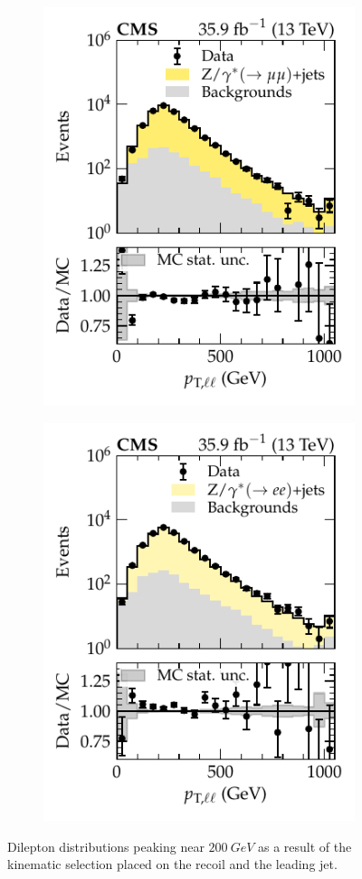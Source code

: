 \begin{figure}[htb]
    \centering
    \begin{subfigure}[b]{0.49\textwidth}
        \centering
        \includegraphics{chapters/041_corrections/images/ptmiss_calib/metres_ptll_mm_incdist.pdf}
        \caption{\dimuplusjets}
        \label{subfiga:metres-zpt}
    \end{subfigure}
    \begin{subfigure}[b]{0.49\textwidth}
        \centering
        \includegraphics{chapters/041_corrections/images/ptmiss_calib/metres_ptll_ee_incdist.pdf}
        \caption{\dieleplusjets}
        \label{subfigb:metres-zpt}
    \end{subfigure}
    \caption[Dilepton \pt distribution.]{
        Dilepton \ptll distributions peaking near $\SI{200}{GeV}$ as a result of the kinematic selection placed on the recoil and the leading jet.
    }
    \label{fig:metres-zpt}
\end{figure}
